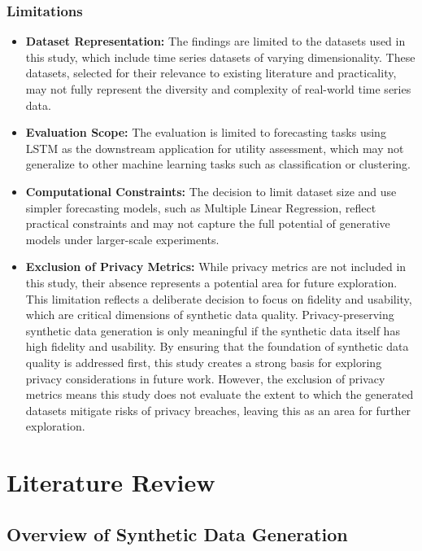 \documentclass{article}
\begin{document}
\subsubsection{Limitations}
\begin{itemize}
    \item \textbf{Dataset Representation:} The findings are limited to the datasets used in this study, which include time series datasets of varying dimensionality.  These datasets, selected for their relevance to existing literature and practicality, may not fully represent the diversity and complexity of real-world time series data.

    \item \textbf{Evaluation Scope:} The evaluation is limited to forecasting tasks using LSTM as the downstream application for utility assessment, which may not generalize to other machine learning tasks such as classification or clustering.
    
    \item \textbf{Computational Constraints:} The decision to limit dataset size and use simpler forecasting models, such as Multiple Linear Regression, reflect practical constraints and may not capture the full potential of generative models under larger-scale experiments.

    \item \textbf{Exclusion of Privacy Metrics: } While privacy metrics are not included in this study, their absence represents a potential area for future exploration. This limitation reflects a deliberate decision to focus on fidelity and usability, which are critical dimensions of synthetic data quality. Privacy-preserving synthetic data generation is only meaningful if the synthetic data itself has high fidelity and usability. By ensuring that the foundation of synthetic data quality is addressed first, this study creates a strong basis for exploring privacy considerations in future work. However, the exclusion of privacy metrics means this study does not evaluate the extent to which the generated datasets mitigate risks of privacy breaches, leaving this as an area for further exploration.

\end{itemize}


\newpage
\section{Literature Review}

\subsection{Overview of Synthetic Data Generation}
\end{document}
